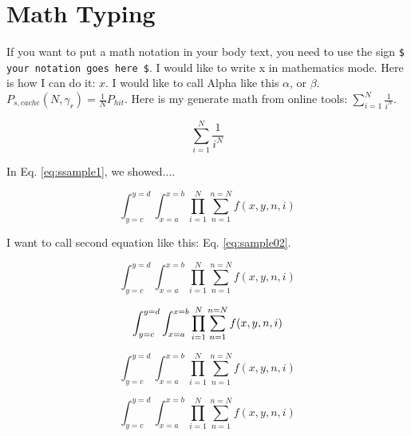 \section{Math Typing}
\label{sec:math}


If you want to put a math notation in your body text, you need to use the sign \verb|$ your notation goes here $|. I would like to write x in mathematics mode. Here is how I can do it: $x$. I would like to call Alpha like this $\alpha$, or $\beta$. $P_{s, cache} (N, \gamma_r) = \frac{1}{N} P_{hit}$. Here is my generate math from online tools: $\sum_{i=1}^{N}\frac{1}{i^{N}}$. 

\begin{equation}
\label{eq:ssample1}
\sum_{i=1}^{N}\frac{1}{i^{N}}
\end{equation}

In Eq. \ref{eq:ssample1}, we showed....

\begin{equation}
\label{eq:sample02}
\int_{y=c}^{y=d} \int_{x=a}^{x=b} \prod_{i=1}^{N} \sum_{n=1}^{n=N} f(x,y,n,i)
\end{equation}

I want to call second equation like this: Eq. \ref{eq:sample02}. 



\begin{equation}
\label{eq:sample03}
\int_{y=c}^{y=d} \int_{x=a}^{x=b} \prod_{i=1}^{N} \sum_{n=1}^{n=N} f(x,y,n,i)
\end{equation}


\begin{equation}
\label{eq:sample04}
\int_{y=c}^{y=d} \int_{x=a}^{x=b} \prod_{i=1}^{N} \sum_{n=1}^{n=N} f(x,y,n,i)
\notag
\end{equation}

\begin{equation}
\label{eq:sample05}
\int_{y=c}^{y=d} \int_{x=a}^{x=b} \prod_{i=1}^{N} \sum_{n=1}^{n=N} f(x,y,n,i)
\end{equation}

\begin{equation}
\label{eq:sample06}
\int_{y=c}^{y=d} \int_{x=a}^{x=b} \prod_{i=1}^{N} \sum_{n=1}^{n=N} f(x,y,n,i)
\end{equation}








